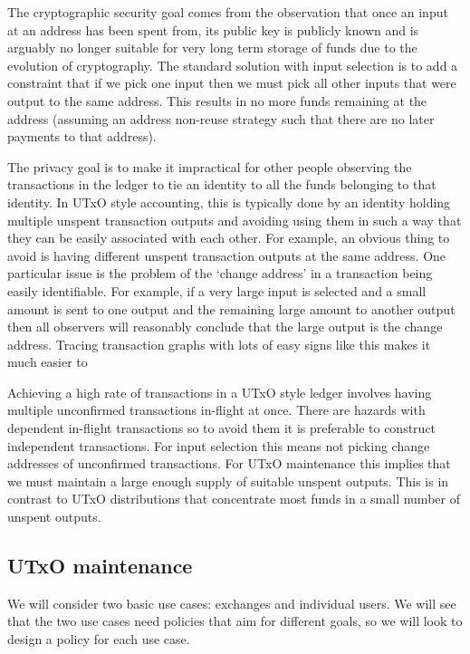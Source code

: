 \documentclass{article}
\theoremstyle{definition}{
  \newtheorem{lemma}{Lemma}[section] %
  \newtheorem{definition}[lemma]{Definition}
}
\theoremstyle{theorem}{
  \newtheorem{invariant}[lemma]{Invariant}
  \newtheorem{proofobligation}[lemma]{Proof Obligation}
}
\numberwithin{equation}{lemma}
\begin{document}
The cryptographic security goal comes from the observation that once an input
at an address has been spent from, its public key is publicly known and is
arguably no longer suitable for very long term storage of funds due to the
evolution of cryptography. The standard solution with input selection is to add
a constraint that if we pick one input then we must pick all other inputs that
were output to the same address. This results in no more funds remaining at the
address (assuming an address non-reuse strategy such that there are no later
payments to that address).

The privacy goal is to make it impractical for other people observing the
transactions in the ledger to tie an identity to all the funds belonging to
that identity. In UTxO style accounting, this is typically done by an identity
holding multiple unspent transaction outputs and avoiding using them in such a
way that they can be easily associated with each other. For example, an obvious
thing to avoid is having different unspent transaction outputs at the same
address. One particular issue is the problem of the `change address' in a
transaction being easily identifiable. For example, if a very large input is
selected and a small amount is sent to one output and the remaining large
amount to another output then all observers will reasonably conclude that the
large output is the change address. Tracing transaction graphs with lots of
easy signs like this makes it much easier to

Achieving a high rate of transactions in a UTxO style ledger involves having
multiple unconfirmed transactions in-flight at once. There are hazards with
dependent in-flight transactions so to avoid them it is preferable to construct
independent transactions. For input selection this means not picking change
addresses of unconfirmed transactions. For UTxO maintenance this implies that
we must maintain a large enough supply of suitable unspent outputs. This is in
contrast to UTxO distributions that concentrate most funds in a small number of
unspent outputs.

\subsection{UTxO maintenance}

We will consider two basic use cases: exchanges and individual users. We will
see that the two use cases need policies that aim for different goals, so we
will look to design a policy for each use case.
\end{document}
